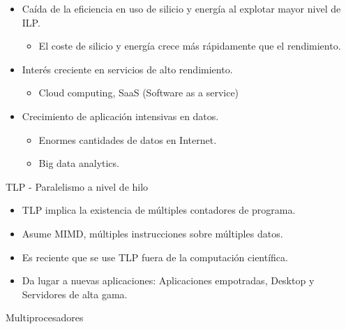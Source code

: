 \documentclass[12pt, twoside, openright]{report} %
\begin{document}
    \begin{itemize}
    
    \item
      Caída de la eficiencia en uso de silicio y energía al explotar
      mayor nivel de ILP.

      \begin{itemize}
      
      \item
        El coste de silicio y energía crece más rápidamente que el
        rendimiento.
      \end{itemize}
    \item
      Interés creciente en servicios de alto rendimiento.

      \begin{itemize}
      
      \item
        Cloud computing, SaaS (Software as a service)
      \end{itemize}
    \item
      Crecimiento de aplicación intensivas en datos.

      \begin{itemize}
      
      \item
        Enormes cantidades de datos en Internet.
      \item
        Big data analytics.
      \end{itemize}
    \end{itemize}

    TLP - Paralelismo a nivel de hilo
    \vspace{-0.5cm}

    \begin{itemize}
    
    \item
      TLP implica la existencia de múltiples contadores de programa.
    \item
      Asume MIMD, múltiples instrucciones sobre múltiples datos.
    \item
      Es reciente que se use TLP fuera de la computación científica.
    \item
      Da lugar a nuevas aplicaciones: Aplicaciones empotradas, Desktop
      y Servidores de alta gama.
    \end{itemize}

    Multiprocesadores
    \vspace{-0.5cm}
\end{document}
